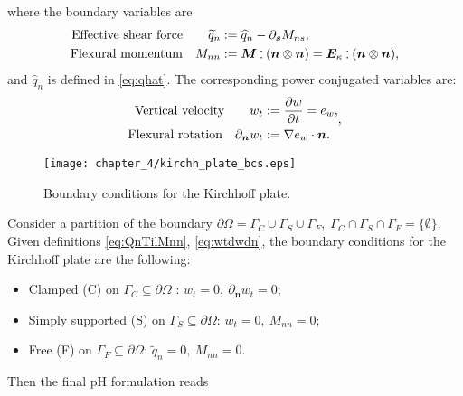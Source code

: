 where the boundary variables are 
\begin{equation}
\label{eq:QnTilMnn}
\begin{aligned}
\text{Effective shear force}  \qquad \widetilde{q}_{n} &:= \widehat{q}_n - \partial_{\bm{s}}{M_{ns}},  \\
\text{Flexural momentum} \quad M_{nn} &:=  \bm{M} \cddot (\bm{n}\otimes{\bm{n}}) = \bm{E}_{\kappa} \cddot (\bm{n}\otimes{\bm{n}}),
\end{aligned}
\end{equation}
and $\widehat{q}_n$ is defined in \eqref{eq:qhat}. The corresponding power conjugated variables are:
\begin{equation}
\label{eq:wtdwdn}
\begin{aligned}
\text{Vertical velocity}  \qquad w_t &:= \diffp{w}{t} = e_w, \\
\text{Flexural rotation} \quad 
\partial_{\bm{n}}{w_t} &:= \nabla{e_w} \cdot \bm{n}.
\end{aligned},
\end{equation}

\begin{figure}[tb]
	\centering
	\texttt{[image: chapter\_4/kirchh\_plate\_bcs.eps]}
	\caption{Boundary conditions for the Kirchhoff plate.}
	\label{fig:bcs_kirchh}
\end{figure}
Consider a partition of the boundary $\partial \Omega  = {\Gamma}_{C} \cup {\Gamma}_{S} \cup {\Gamma}_{F}, \; {\Gamma}_{C} \cap {\Gamma}_{S} \cap {\Gamma}_{F} = \{\emptyset\}$. Given definitions \eqref{eq:QnTilMnn}, \eqref{eq:wtdwdn}, the boundary conditions for the Kirchhoff plate \cite{gustafsson2018} are the following:
\begin{itemize}
	\item Clamped (C) on $\Gamma_{C}\subseteq \partial \Omega$ : $w_t = 0, \ \partial_{\bm{n}}{w_t} = 0$;
	\item Simply supported (S) on $\Gamma_{S}\subseteq \partial \Omega$: $w_t = 0, \ M_{nn} = 0$;
	\item Free (F) on $\Gamma_{F}\subseteq \partial \Omega$: $\widetilde{q}_n = 0, \ M_{nn}=0$.
\end{itemize}
Then the final pH formulation reads

